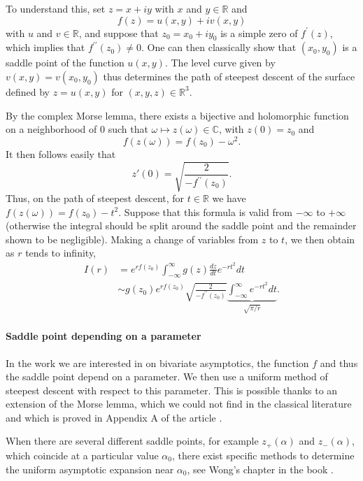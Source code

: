 \documentclass[11pt]{article}
\newcommand\citeS[1]{\cite{#1}}
\theoremstyle{definition}
\begin{document}
To understand this, set $z=x+i y$ with $x$ and $y\in\mathbb{R}$ and
$$
f(z)=u(x, y)+i v(x, y)
$$
with $u$ and $v\in\mathbb{R}$,
and suppose that $z_0=x_0+i y_0$ is a simple zero of $f^{\prime}(z)$, which implies that $f^{\prime \prime}\left(z_0\right) \neq 0$. One can then classically show that $(x_0, y_0)$ is a saddle point of the function $u(x, y)$. The level curve given by $v(x, y)=v\left(x_0, y_0\right)$ thus determines the path of steepest descent of the surface defined by $z=u(x, y)$ for $(x, y, z)\in\mathbb{R}^3$. 

By the complex Morse lemma, there exists a bijective and holomorphic function on a neighborhood of $0$ such that $\omega\mapsto z(\omega)\in\mathbb{C}$, with $z(0)=z_0$ and
$$
f(z(\omega))=f\left(z_0\right)- \omega^2.
$$
It then follows easily that
$$
z'(0)=\sqrt{\frac{2}{-f^{\prime \prime}\left(z_0\right)}}.
$$
Thus, on the path of steepest descent, for $t\in\mathbb{R}$ we have
$f(z(\omega))=f\left(z_0\right)-t^2.$ 
Suppose that this formula is valid from $-\infty$ to $+\infty$ (otherwise the integral should be split around the saddle point and the remainder shown to be negligible). Making a change of variables from $z$ to $t$, we then obtain as $r$ tends to infinity,
\begin{align*}
I(r)&=e^{r f\left(z_0\right)} \int_{-\infty}^{\infty} g(z) \frac{d z}{d t} e^{-r t^2} d t
\\ &\sim
 g\left(z_0\right) e^{r f\left(z_0\right)} \sqrt{\frac{2}{-f^{\prime \prime}\left(z_0\right)}} 
\underbrace{\int_{-\infty}^{\infty} e^{-r t^2} d t}_{\sqrt{\pi/r}}.
\end{align*}

\paragraph{Saddle point depending on a parameter}
In the work we are interested in on bivariate asymptotics, the function $f$ and thus the saddle point depend on a parameter. We then use a uniform method of steepest descent with respect to this parameter. This is possible thanks to an extension of the Morse lemma, which we could not find in the classical literature and which is proved in Appendix A of the article \citeS{franceschi_kourkova_petit_asymptotics_2024}.

When there are several different saddle points, for example $z_+(\alpha)$ and $z_-(\alpha)$, which coincide at a particular value $\alpha_0$, there exist specific methods to determine the uniform asymptotic expansion near $\alpha_0$, see Wong’s chapter in the book \cite{Wong2001}.
\end{document}

